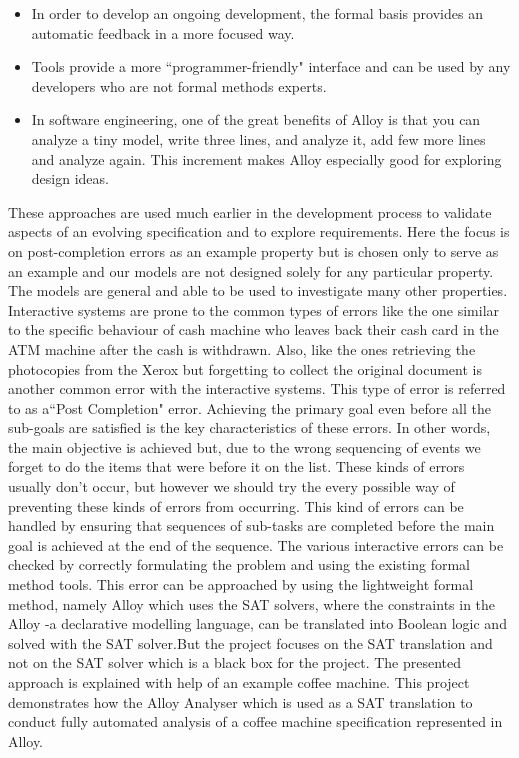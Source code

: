 \documentclass[a4paper,12pt]{extarticle}
\begin{document}
\begin{itemize}
\item \textrm{In order to develop an ongoing development, the formal basis provides an automatic feedback in a more focused way.}
\item \textrm{Tools provide a more ``programmer-friendly" interface and can be used by any developers who are not formal methods experts.}\cite{Boyatt}
\item \textrm{In software engineering, one of the great benefits of Alloy is that you can analyze a tiny model, write three lines, and analyze it, add few more lines and analyze again. This increment makes Alloy especially good for exploring design ideas. }\cite{ErichGamma1995}
\end{itemize}
\textrm{These approaches are used much earlier in the development process to validate aspects of an evolving specification and to explore requirements\cite{Hoare1986}. Here the focus is on post-completion errors as an example property but is chosen only to serve as an example and our models are not designed solely for any particular property\cite{ErichGamma1995}. The models are general and able to be used to investigate many other properties.
Interactive systems are prone to the common types of errors like the one similar to the specific behaviour of cash machine who leaves back their cash card in the ATM machine after the cash is withdrawn. Also, like the ones retrieving the photocopies from the Xerox but forgetting to collect the original document is another common error with the interactive systems. This type of error is referred to as a``Post Completion" error. Achieving the primary goal even before all the sub-goals are satisfied is the key characteristics of these errors. In other words, the main objective is achieved but, due to the wrong sequencing of events we forget to do the items that were before it on the list. These kinds of errors usually don't occur, but however we should try the every possible way of preventing these kinds of errors from occurring. This kind of errors can be handled by ensuring that sequences of sub-tasks are completed before the main goal is achieved at the end of the sequence. The various interactive errors can be checked by correctly formulating the problem and using the existing formal method tools\cite{P.Curson}. This error can be approached by using the lightweight formal method, namely Alloy which uses the SAT solvers, where the constraints in the Alloy -a declarative modelling language, can be translated into Boolean logic and solved with the SAT solver.But the project focuses on the SAT translation and not on the  SAT solver which is a black box for the project. The presented approach is explained with help of an example coffee machine. This project demonstrates how the Alloy Analyser which is used as a SAT translation to conduct fully automated analysis of a coffee machine specification represented in Alloy. 
}
\end{document}
